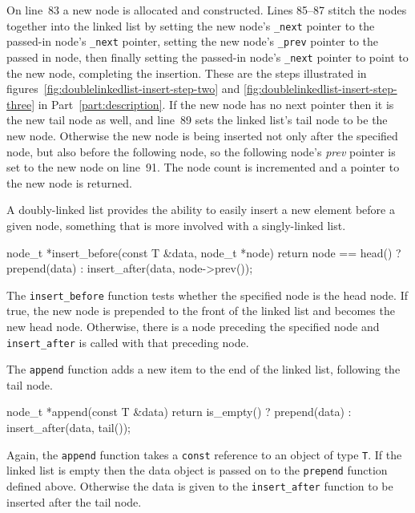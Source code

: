 \documentclass{article}
\begin{document}
  On line~83 a new node is allocated and constructed. Lines 85--87 stitch the nodes together into the linked list by setting the new node's \verb|_next| pointer to the passed-in node's \verb|_next| pointer, setting the new node's \verb|_prev| pointer to the passed in node, then finally setting the passed-in node's \verb|_next| pointer to point to the new node, completing the insertion. These are the steps illustrated in figures~\ref{fig:doublelinkedlist-insert-step-two} and \ref{fig:doublelinkedlist-insert-step-three} in Part~\ref{part:description}. If the new node has no next pointer then it is the new tail node as well, and line~89 sets the linked list's tail node to be the new node. Otherwise the new node is being inserted not only after the specified node, but also before the following node, so the following node's \emph{prev} pointer is set to the new node on line~91. The node count is incremented and a pointer to the new node is returned.

  A doubly-linked list provides the ability to easily insert a new element before a given node, something that is more involved with a singly-linked list.
  \begin{lstcpp}
  node_t *insert_before(const T &data, node_t *node) {
    return node == head() ? prepend(data)
                          : insert_after(data, node->prev());
  }\end{lstcpp}
  The \verb|insert_before| function tests whether the specified node is the head node. If true, the new node is prepended to the front of the linked list and becomes the new head node. Otherwise, there is a node preceding the specified node and \verb|insert_after| is called with that preceding node.

  The \verb|append| function adds a new item to the end of the linked list, following the tail node.
  \begin{lstcpp}
  node_t *append(const T &data) {
    return is_empty() ? prepend(data)
                      : insert_after(data, tail());
  }\end{lstcpp}
  Again, the \verb|append| function takes a \verb|const| reference to an object of type \verb|T|. If the linked list is empty then the data object is passed on to the \verb|prepend| function defined above. Otherwise the data is given to the \verb|insert_after| function to be inserted after the tail node.
\end{document}
